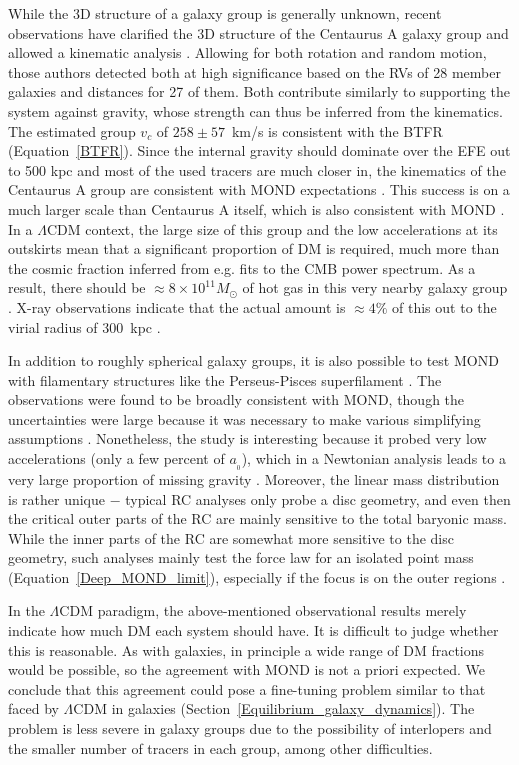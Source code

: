 \documentclass[fleqn,usenatbib,useAMS,onecolumn]{mnras} %
\begin{document}
While the 3D structure of a galaxy group is generally unknown, recent observations have clarified the 3D structure of the Centaurus A galaxy group and allowed a kinematic analysis \citep{Muller_2022}. Allowing for both rotation and random motion, those authors detected both at high significance based on the RVs of 28 member galaxies and distances for 27 of them. Both contribute similarly to supporting the system against gravity, whose strength can thus be inferred from the kinematics. The estimated group $v_c$ of $258 \pm 57$~km/s is consistent with the BTFR (Equation~\ref{BTFR}). Since the internal gravity should dominate over the EFE out to 500 kpc \citep{Oria_2021} and most of the used tracers are much closer in, the kinematics of the Centaurus A group are consistent with MOND expectations \citep{Muller_2022}. This success is on a much larger scale than Centaurus A itself, which is also consistent with MOND \citep{Samurovic_2016_Cen_A}. In a $\Lambda$CDM context, the large size of this group and the low accelerations at its outskirts mean that a significant proportion of DM is required, much more than the cosmic fraction inferred from e.g. fits to the CMB power spectrum. As a result, there should be $\approx 8 \times 10^{11} M_\odot$ of hot gas in this very nearby galaxy group \citep{Muller_2022}. X-ray observations indicate that the actual amount is $\approx 4\%$ of this out to the virial radius of 300~kpc \citep{Gaspari_2019}.

In addition to roughly spherical galaxy groups, it is also possible to test MOND with filamentary structures like the Perseus-Pisces superfilament \citep{Haynes_1986}. The observations were found to be broadly consistent with MOND, though the uncertainties were large because it was necessary to make various simplifying assumptions \citep{Milgrom_1997}. Nonetheless, the study is interesting because it probed very low accelerations (only a few percent of $a_{_0}$), which in a Newtonian analysis leads to a very large proportion of missing gravity \citep{Eisenstein_1997}. Moreover, the linear mass distribution is rather unique $-$ typical RC analyses only probe a disc geometry, and even then the critical outer parts of the RC are mainly sensitive to the total baryonic mass. While the inner parts of the RC are somewhat more sensitive to the disc geometry, such analyses mainly test the force law for an isolated point mass (Equation~\ref{Deep_MOND_limit}), especially if the focus is on the outer regions \citep[e.g.][]{Lelli_2019}.

In the $\Lambda$CDM paradigm, the above-mentioned observational results merely indicate how much DM each system should have. It is difficult to judge whether this is reasonable. As with galaxies, in principle a wide range of DM fractions would be possible, so the agreement with MOND is not a priori expected. We conclude that this agreement could pose a fine-tuning problem similar to that faced by $\Lambda$CDM in galaxies (Section~\ref{Equilibrium_galaxy_dynamics}). The problem is less severe in galaxy groups due to the possibility of interlopers and the smaller number of tracers in each group, among other difficulties.
\end{document}

